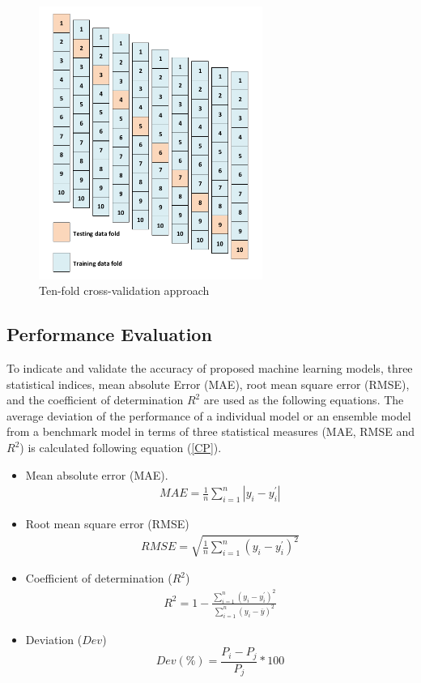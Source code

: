 \documentclass[11pt]{article}
\begin{document}
	\begin{figure}[!h]
		\begin{center}
			\includegraphics[width=0.65\textwidth,height=0.65\textwidth]{TC}
		\end{center}
		\caption{Ten-fold cross-validation approach}
		\label{fig:TFC}
	\end{figure}
	
	\subsection{Performance Evaluation}
	
	To indicate and validate the accuracy of proposed machine learning models, three statistical indices, mean absolute Error (MAE), root mean square error (RMSE), and the coefficient of determination $R^2$ are used as the following equations. The average deviation of the performance of a individual model or an ensemble model from a benchmark model in terms of  three statistical measures (MAE, RMSE and  $R^2$) is calculated following  equation (\ref{CP}).	
	
	\begin{itemize}
		\item Mean absolute error (MAE). 
		\begin{eqnarray}
		MAE = \frac{1}{n}\sum_{i=1}^{n}{|y_i - y_i^{'}|}                                                       
		\end{eqnarray}
		\item Root mean square error (RMSE)
		\begin{eqnarray}
		RMSE = \sqrt{\frac{1}{n}\sum_{i=1}^{n}({{ y_i  - y_i^{'}}} )^2}                                                         
		\end{eqnarray}
		\item Coefficient of determination ($R^2$)
		\begin{eqnarray}
		R^2 = 1 - \frac{\sum_{i=1}^{n}(y_i - y_i^{'})^2}{ \sum_{i=1}^{n} (y_i -\overline{y})^2  }                                             
		\end{eqnarray}
		\item Deviation ($Dev$)
		\begin{equation}
		\label{CP}
		Dev(\%) = \frac{P_i - P_{j}}{ P_{j}} * 100
		\end{equation}	
	\end{itemize} 
	
\end{document}
